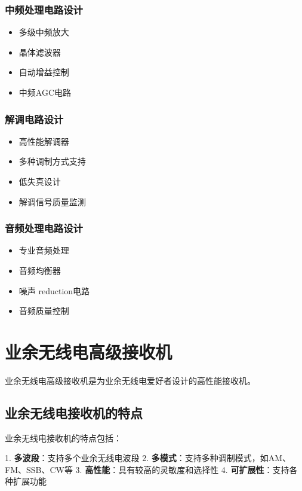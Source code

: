 \documentclass[12pt,UTF8]{ctexbook}
\begin{document}
\subsection{中频处理电路设计}\begin{itemize}
  \item 多级中频放大
  \item 晶体滤波器
  \item 自动增益控制
  \item 中频AGC电路\end{itemize}

\subsection{解调电路设计}\begin{itemize}
  \item 高性能解调器
  \item 多种调制方式支持
  \item 低失真设计
  \item 解调信号质量监测\end{itemize}

\subsection{音频处理电路设计}\begin{itemize}
  \item 专业音频处理
  \item 音频均衡器
  \item 噪声 reduction电路
  \item 音频质量控制\end{itemize}

\chapter{业余无线电高级接收机}

业余无线电高级接收机是为业余无线电爱好者设计的高性能接收机。

\section{业余无线电接收机的特点}

业余无线电接收机的特点包括：

1. \textbf{多波段}：支持多个业余无线电波段
2. \textbf{多模式}：支持多种调制模式，如AM、FM、SSB、CW等
3. \textbf{高性能}：具有较高的灵敏度和选择性
4. \textbf{可扩展性}：支持各种扩展功能
\end{document}

